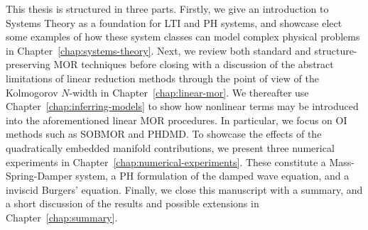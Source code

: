 This thesis is structured in three parts.
Firstly, we give an introduction to Systems Theory as a foundation for \ac{LTI} and \ac{PH} systems, and showcase elect some examples of how these system classes can model complex physical problems in Chapter~\ref{chap:systems-theory}.
Next, we review both standard and structure-preserving \ac{MOR} techniques before closing with a discussion of the abstract limitations of linear reduction methods through the point of view of the Kolmogorov $N$-width in Chapter~\ref{chap:linear-mor}.
We thereafter use Chapter~\ref{chap:inferring-models} to show how nonlinear terms may be introduced into the aforementioned linear \ac{MOR} procedures.
In particular, we focus on \ac{OI} methods such as \ac{SOBMOR} and \ac{PHDMD}.
To showcase the effects of the quadratically embedded manifold contributions, we present three numerical experiments in Chapter~\ref{chap:numerical-experiments}.
These constitute a Mass-Spring-Damper system, a \ac{PH} formulation of the damped wave equation, and a inviscid Burgers' equation.
Finally, we close this manuscript with a summary, and a short discussion of the results and possible extensions in Chapter~\ref{chap:summary}.
